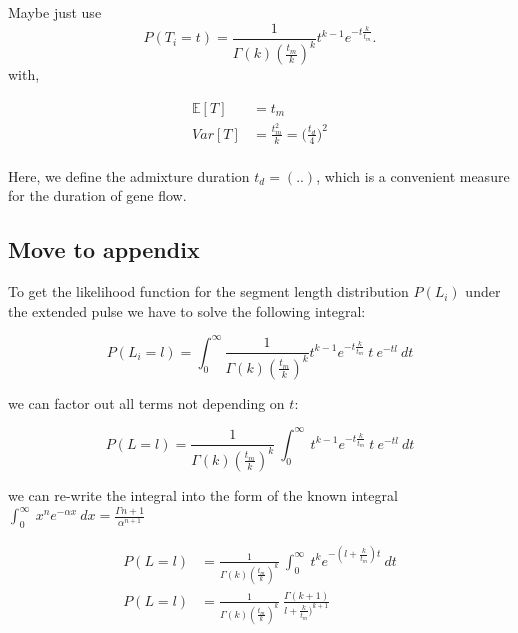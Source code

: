 \documentclass[]{article}
\begin{document}
Maybe just use
\begin{equation}
\label{eq:RV_extended_pulse}
  P(T_i=t)=\frac{1}{\Gamma(k)(\frac{t_m}{k})^k}t^{k-1}e^{-t\frac{k}{t_m}}.
\end{equation} 
with,

\begin{equation}
\begin{split}
\label{eq:RV_extended_pulse_properties}
\mathbb{E}[T]&=t_{m} \\
Var[T]&=\frac{t_{m}^2}{k} = \bigg(\frac{t_d}{4} \bigg)^2  \\
\end{split}
\end{equation}

Here, we define the admixture duration $t_d= (..)$, which is a convenient measure for the duration of gene flow.

\subsection{Move to appendix}
To get the likelihood function for the segment length distribution $P(L_i)$ under the extended pulse we have to solve the following integral:

\begin{equation}
\label{eq:Likelihood_function_extended_pulse_1}
    P(L_i=l) = \int_{0}^{\infty} \frac{1}{\Gamma(k)(\frac{t_m}{k})^k}t^{k-1}e^{-t\frac{k}{t_m}}\ t\ e^{-tl} \ dt 
\end{equation}

we can factor out all terms not depending on $t$:

\begin{equation}
\label{eq:Likelihood_function_extended_pulse_2}
    P(L=l) = \frac{1}{\Gamma(k)(\frac{t_m}{k})^k}\ \int_{0}^{\infty}\ t^{k-1}e^{-t\frac{k}{t_m}}\ t\ e^{-tl} \ dt 
\end{equation}

 
we can re-write the integral into the  form of the known integral $\int_{0}^{\infty}\ x^n e^{-\alpha x} \ dx= \frac{\Gamma{n+1}}{\alpha^{n+1}}$

\begin{equation}
\begin{split}
\label{eq:Likelihood_function_extended_pulse_3}
    P(L=l) &= \frac{1}{\Gamma(k)(\frac{t_m}{k})^k}\ \int_{0}^{\infty}\ t^{k}e^{-(l+\frac{k}{t_m})t} \ dt \\ 
    P(L=l) &= \frac{1}{\Gamma(k)(\frac{t_m}{k})^k}\ \frac{\Gamma(k+1)}{l+\frac{k}{t_m})^{k+1}} 
\end{split}
\end{equation}
\end{document}
